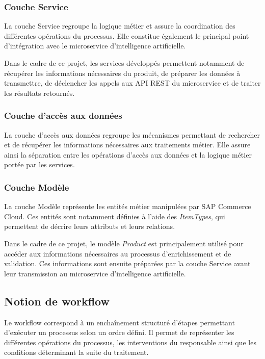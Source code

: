 \subsubsection{Couche Service}

La couche Service regroupe la logique métier et assure la coordination des différentes opérations du processus. Elle constitue également le principal point d'intégration avec le microservice d'intelligence artificielle.

Dans le cadre de ce projet, les services développés permettent notamment de récupérer les informations nécessaires du produit, de préparer les données à transmettre, de déclencher les appels aux API REST du microservice et de traiter les résultats retournés.

\subsubsection{Couche d'accès aux données}

La couche d'accès aux données regroupe les mécanismes permettant de rechercher et de récupérer les informations nécessaires aux traitements métier. Elle assure ainsi la séparation entre les opérations d'accès aux données et la logique métier portée par les services.

\subsubsection{Couche Modèle}

La couche Modèle représente les entités métier manipulées par SAP Commerce Cloud. Ces entités sont notamment définies à l'aide des \textit{ItemTypes}, qui permettent de décrire leurs attributs et leurs relations.

Dans le cadre de ce projet, le modèle \textit{Product} est principalement utilisé pour accéder aux informations nécessaires au processus d'enrichissement et de validation. Ces informations sont ensuite préparées par la couche Service avant leur transmission au microservice d'intelligence artificielle.

\subsection{Notion de workflow}

Le workflow correspond à un enchaînement structuré d'étapes permettant d'exécuter un processus selon un ordre défini. Il permet de représenter les différentes opérations du processus, les interventions du responsable ainsi que les conditions déterminant la suite du traitement.

